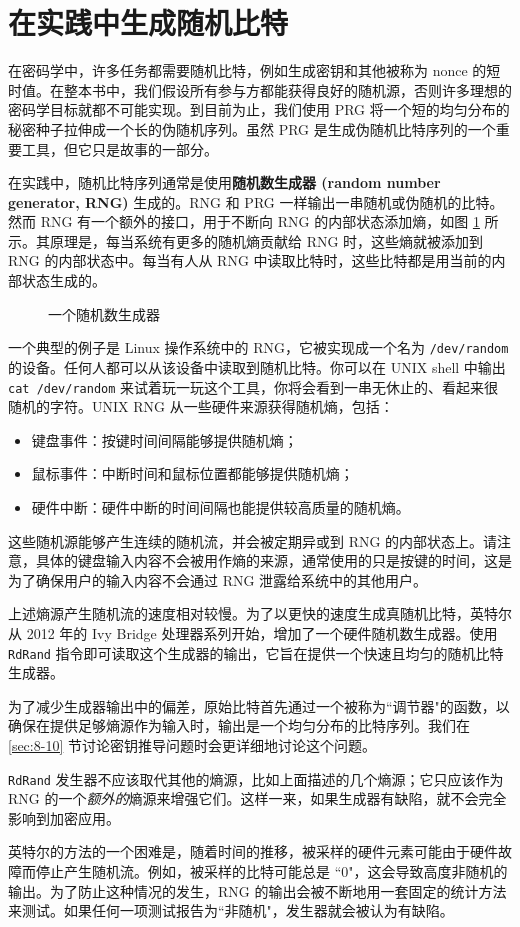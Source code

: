 \section{在实践中生成随机比特}

在密码学中，许多任务都需要随机比特，例如生成密钥和其他被称为 nonce 的短时值。在整本书中，我们假设所有参与方都能获得良好的随机源，否则许多理想的密码学目标就都不可能实现。到目前为止，我们使用 PRG 将一个短的均匀分布的秘密种子拉伸成一个长的伪随机序列。虽然 PRG 是生成伪随机比特序列的一个重要工具，但它只是故事的一部分。

在实践中，随机比特序列通常是使用\textbf{随机数生成器 (random number generator, RNG)} 生成的。RNG 和 PRG 一样输出一串随机或伪随机的比特。然而 RNG 有一个额外的接口，用于不断向 RNG 的内部状态添加熵，如图 \ref{fig:3-14} 所示。其原理是，每当系统有更多的随机熵贡献给 RNG 时，这些熵就被添加到 RNG 的内部状态中。每当有人从 RNG 中读取比特时，这些比特都是用当前的内部状态生成的。

\begin{figure}
	\centering
	
	\caption{一个随机数生成器}
	\label{fig:3-14}
\end{figure}

一个典型的例子是 Linux 操作系统中的 RNG，它被实现成一个名为 \texttt{/dev/random} 的设备。任何人都可以从该设备中读取到随机比特。你可以在 UNIX shell 中输出 \texttt{cat /dev/random} 来试着玩一玩这个工具，你将会看到一串无休止的、看起来很随机的字符。UNIX RNG 从一些硬件来源获得随机熵，包括：
\begin{itemize}
	\item 键盘事件：按键时间间隔能够提供随机熵；
	\item 鼠标事件：中断时间和鼠标位置都能够提供随机熵；
	\item 硬件中断：硬件中断的时间间隔也能提供较高质量的随机熵。
\end{itemize}
这些随机源能够产生连续的随机流，并会被定期异或到 RNG 的内部状态上。请注意，具体的键盘输入内容不会被用作熵的来源，通常使用的只是按键的时间，这是为了确保用户的输入内容不会通过 RNG 泄露给系统中的其他用户。

\begin{snote}[高熵的随机生成。]
上述熵源产生随机流的速度相对较慢。为了以更快的速度生成真随机比特，英特尔从 2012 年的 Ivy Bridge 处理器系列开始，增加了一个硬件随机数生成器。使用 \texttt{RdRand} 指令即可读取这个生成器的输出，它旨在提供一个快速且均匀的随机比特生成器。

为了减少生成器输出中的偏差，原始比特首先通过一个被称为``调节器"的函数，以确保在提供足够熵源作为输入时，输出是一个均匀分布的比特序列。我们在 \ref{sec:8-10} 节讨论密钥推导问题时会更详细地讨论这个问题。

\texttt{RdRand} 发生器不应该取代其他的熵源，比如上面描述的几个熵源；它只应该作为 RNG 的一个\emph{额外的}熵源来增强它们。这样一来，如果生成器有缺陷，就不会完全影响到加密应用。

英特尔的方法的一个困难是，随着时间的推移，被采样的硬件元素可能由于硬件故障而停止产生随机流。例如，被采样的比特可能总是 ``$0$"，这会导致高度非随机的输出。为了防止这种情况的发生，RNG 的输出会被不断地用一套固定的统计方法来测试。如果任何一项测试报告为``非随机"，发生器就会被认为有缺陷。
\end{snote}